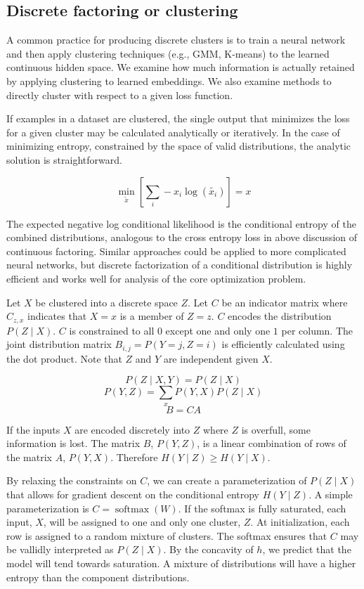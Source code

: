 \documentclass[11pt,letterpaper]{article}
\begin{document}
\subsection{Discrete factoring or clustering}

A common practice for producing discrete clusters is to train a neural network and then apply clustering techniques (e.g., GMM, K-means) to the learned continuous hidden space. We examine how much information is actually retained by applying clustering to learned embeddings. We also examine methods to directly cluster with respect to a given loss function.

If examples in a dataset are clustered, the single output that minimizes the loss for a given cluster may be calculated analytically or iteratively. In the case of minimizing entropy, constrained by the space of valid distributions, the analytic solution is straightforward.

$$\min_{\tilde{x}}[\sum_i-x_i \log(\tilde{x_i})] = x$$

The expected negative log conditional likelihood is the conditional entropy of the combined distributions, analogous to the cross entropy loss in above discussion of continuous factoring. Similar approaches could be applied to more complicated neural networks, but discrete factorization of a conditional distribution is highly efficient and works well for analysis of the core optimization problem.

Let $X$ be clustered into a discrete space $Z$. Let $C$ be an indicator matrix where $C_{z,x}$ indicates that $X=x$ is a member of $Z=z$. $C$ encodes the distribution $P(Z \mid X)$. $C$ is constrained to all $0$ except one and only one $1$ per column. The joint distribution matrix $B_{i,j}=P(Y=j,Z=i)$ is efficiently calculated using the dot product. Note that $Z$ and $Y$ are independent given $X$.

$$P(Z \mid X,Y) = P(Z \mid X)$$
$$P(Y,Z) = \sum_x P(Y,X) P(Z \mid X)$$
$$B = C A $$ 

If the inputs $X$ are encoded discretely into $Z$ where $Z$ is overfull, some information is lost.  The matrix $B$, $P(Y,Z)$, is a linear combination of rows of the matrix $A$, $P(Y,X)$. Therefore $H(Y \mid Z) \ge H(Y \mid X)$. 

By relaxing the constraints on $C$, we can create a parameterization of $P(Z \mid X)$ that allows for gradient descent on the conditional entropy $H(Y\mid Z)$. A simple parameterization
is $C=\operatorname{softmax}(W)$. If the softmax is fully saturated, each input, $X$, will be assigned to one and only one cluster, $Z$. At initialization, each row is assigned to a random mixture of clusters. The softmax ensures that $C$ may be vallidly interpreted as $P(Z \mid X)$. By the concavity of $h$, we predict that the model will tend towards saturation. A mixture of distributions will have a higher entropy than the component distributions.
\end{document}
